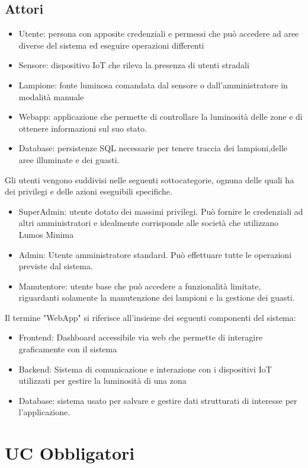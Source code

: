 \documentclass[12pt]{article}
\begin{document}
\subsection{Attori}
\begin{itemize}
	\item Utente: persona con apposite credenziali e permessi che può accedere ad aree diverse del sistema ed eseguire operazioni differenti
	\item Sensore: dispositivo IoT che rileva la presenza di utenti stradali
	\item Lampione: fonte luminosa comandata dal sensore o dall'amministratore in modalità manuale
	\item Webapp: applicazione che permette di controllare la luminosità delle zone e di ottenere informazioni sul suo stato.
	\item Database: persistenze SQL necessarie per tenere traccia dei lampioni,delle aree illuminate e dei guasti.
\end{itemize}
Gli utenti vengono suddivisi nelle seguenti sottocategorie, ognuna delle quali ha dei privilegi e delle azioni eseguibili specifiche.
\begin{itemize}
	\item SuperAdmin: utente dotato dei massimi privilegi. Può fornire le credenziali ad altri amministratori e idealmente corrisponde alle società che utilizzano Lumos Minima
	\item Admin: Utente amministratore standard. Può effettuare tutte le operazioni previste dal sistema.
	\item Manutentore: utente base che può accedere a funzionalità limitate, riguardanti solamente la manutenzione dei lampioni e la gestione dei guasti.
\end{itemize} 
Il termine "WebApp" si riferisce all'insieme dei seguenti componenti del sistema:
\begin{itemize}
	\item Frontend: Dashboard accessibile via web che permette di interagire graficamente con il sistema
	\item Backend: Sistema di comunicazione e interazione con i dispositivi IoT utilizzati per gestire la luminosità di una zona
	\item Database: sistema usato per salvare e gestire dati strutturati di interesse per l'applicazione.
\end{itemize}


\pagebreak
\section{UC Obbligatori}
\end{document}
